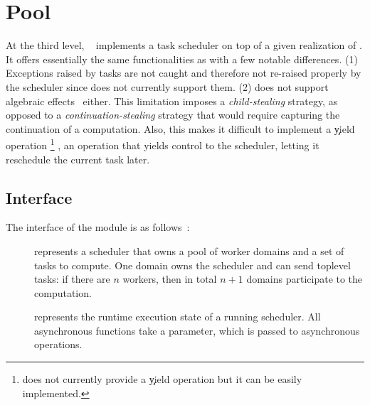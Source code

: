 \section{Pool}
\label{sec:parabs_pool}

At the third level, ~ implements a task scheduler on top of a given realization of .
It offers essentially the same functionalities as \Domainslib with a few notable differences.
(1) Exceptions raised by tasks are not caught and therefore not re-raised properly by the scheduler since \ZooLang does not currently support them.
(2) \ZooLang does not support algebraic effects~\citep{DBLP:conf/pldi/Sivaramakrishnan21} either.
%
This limitation imposes a \emph{child-stealing} strategy, as opposed to a \emph{continuation-stealing} strategy that would require capturing the continuation of a computation.
%
Also, this makes it difficult to implement a \c{yield} operation%
\footnote{
\Domainslib does not currently provide a \c{yield} operation but it can be easily implemented.
}%
, \ie an operation that yields control to the scheduler, letting it reschedule the current task later.

\subsection{Interface}
\label{sec:parabs_pool_interface}

The \OCaml interface of the  module is as follows~:

\begin{description}
\item[] represents a scheduler that owns a pool of
  worker domains and a set of tasks to compute. One domain owns the
  scheduler and can send toplevel tasks: if there are $n$ workers,
  then in total $n + 1$ domains participate to the computation.

\item[] represents the runtime execution
  state of a running scheduler. All asynchronous functions take
  a  parameter, which is passed to asynchronous
  operations.

\item[]
\end{description}

